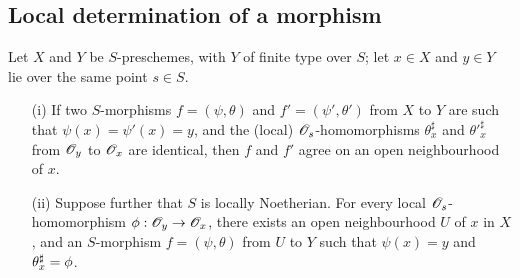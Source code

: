 \subsection{Local determination of a morphism}
\label{subsection:I.6.5}

\begin{proposition}[6.5.1]
\label{I.6.5.1}
Let $X$ and $Y$ be $S$-preschemes, with $Y$ of finite type over $S$;
let $x\in X$ and $y\in Y$ lie over the same point $s\in S$.
\begin{enumerate}
  \item[{\rm(i)}] If two $S$-morphisms $f=(\psi,\theta)$ and $f'=(\psi',\theta')$ from $X$ to $Y$ are such that $\psi(x)=\psi'(x)=y$, and the (local) $\mathscr{O}_s$-homomorphisms $\theta_x^\sharp$ and ${\theta'}_x^\sharp$ from $\mathscr{O}_y$ to $\mathscr{O}_x$ are identical, then $f$ and $f'$ agree on an open neighbourhood of $x$.
  \item[{\rm(ii)}] Suppose further that $S$ is locally Noetherian.
    For every local $\mathscr{O}_s$-homomorphism $\vphi:\sh{O}_y\to\sh{O}_x$, there exists an open neighbourhood $U$ of $x$ in $X$, and an $S$-morphism $f=(\psi,\theta)$ from $U$ to $Y$ such that $\psi(x)=y$ and $\theta_x^\sharp=\phi$.
\end{enumerate}
\end{proposition}

